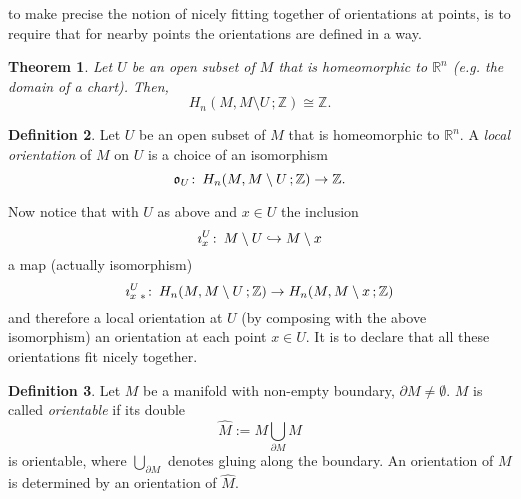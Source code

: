 \documentclass[12pt]{article}
\newtheorem{thm}{Theorem}
\theoremstyle{definition}
\newtheorem{defn}[thm]{Definition}
\theoremstyle{remark}
\numberwithin{equation}{subsection}
\newcommand{\BR}{\mathbb{R}}
\newcommand{\BZ}{\mathbb{Z}}
\newcommand{\n}{\newline}
\def\co{\colon\thinspace}
\begin{document}
   to make precise the notion of nicely
  fitting together of orientations at points, is to require that for
  nearby points the orientations are defined in a
   way.
  \begin{thm}
    Let $U$ be an open subset of $M$ that is homeomorphic to $\BR^n$
    (e.g. the domain of a chart).  Then,
 $$H_n(M,M\setminus U \,; \BZ)\cong \BZ.$$
\end{thm}

\begin{defn} Let $U$ be an open subset of $M$ that is homeomorphic
  to $\BR^n$. A \emph{local orientation} of $M$ on $U$ is a choice
  of an isomorphism
 $$\mathfrak{o}_U \co H_n(M,M\setminus U \,; \BZ) \to \BZ.$$
\end{defn}

Now notice that with $U$ as above and $x\in U$ the inclusion
  $$\imath^U_x\co M\setminus U  \hookrightarrow  M\setminus x$$
 a map (actually isomorphism) 
      $$\imath^U_{x\,\,*}\co H_n(M,M\setminus U \,; \BZ) \to H_n(M,M\setminus x\,;\mathbb{Z})$$
      and therefore a local orientation at $U$
       (by composing with the above
      isomorphism) an orientation at each point $x\in U$.  It is
       to declare that all these
      orientations fit nicely together.



\begin{defn}
  Let $M$ be a manifold with non-empty boundary, $\partial M\neq
  \emptyset$. $M$ is called \emph{orientable} if its double
     $$\hat{M}:=M\bigcup_{\partial M}M$$
is orientable, where $\bigcup_{\partial M}$ denotes gluing along the boundary.\n
An orientation of $M$ is determined by an orientation of $\hat{M}$.    
\end{defn}
\end{document}

